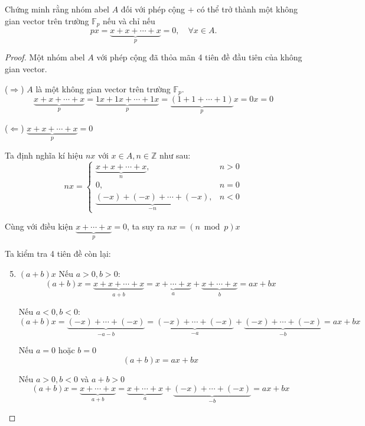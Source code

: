 \begin{exercise}
    Chứng minh rằng nhóm abel $A$ đối với phép cộng $+$ có thể trở thành một không gian vector trên trường $\mathbb{F}_{p}$ nếu và chỉ nếu
    \[ px = \underbrace{x + x + \cdots + x}_{p} = 0,\quad \forall x\in A. \]
\end{exercise}

\begin{proof}
    Một nhóm abel $A$ với phép cộng đã thỏa mãn 4 tiên đề đầu tiên của không gian vector.
    
    ($\Rightarrow$) $A$ là một không gian vector trên trường $\mathbb{F}_{p}$.
    \[ \underbrace{x + x + \cdots + x}_{p} = \underbrace{1x + 1x + \cdots + 1x}_{p} = \underbrace{(1 + 1 + \cdots + 1)}_{p}x = 0x = 0 \]
    
    ($\Leftarrow$) $\underbrace{x + x + \cdots + x}_{p} = 0$
    
    Ta định nghĩa kí hiệu $nx$ với $x\in A, n\in\mathbb{Z}$ như sau:
    \[
        nx =
        \begin{cases}
            \underbrace{x + x + \cdots + x}_{n},           & n > 0 \\
            0,                                             & n = 0 \\
            \underbrace{(-x) + (-x) + \cdots + (-x)}_{-n}, & n < 0
        \end{cases}
    \]
    
    Cùng với điều kiện $\underbrace{x + \cdots + x}_{p} = 0$, ta suy ra $nx = (n\bmod{p})x$
    
    Ta kiểm tra 4 tiên đề còn lại:
    \begin{enumerate}[label= (V\arabic*)]
        \setcounter{enumi}{4}
        \item $(a + b)x$
              Nếu $a > 0, b > 0$:
              \[ (a + b)x = \underbrace{x + x + \cdots + x}_{a+b} = \underbrace{x + \cdots + x}_{a} + \underbrace{x + \cdots + x}_{b} = ax + bx \]
              
              Nếu $a < 0, b < 0$:
              \[ (a + b)x = \underbrace{(-x) + \cdots + (-x)}_{-a-b} = \underbrace{(-x) + \cdots + (-x)}_{-a} + \underbrace{(-x) + \cdots + (-x)}_{-b} = ax + bx \]
              
              Nếu $a = 0$ hoặc $b = 0$
              \[ (a + b)x = ax + bx \]
              
              Nếu $a > 0, b < 0$ và $a + b > 0$
              \[ (a + b)x = \underbrace{x + \cdots + x}_{a+b} = \underbrace{x + \cdots + x}_{a} + \underbrace{(-x) + \cdots + (-x)}_{-b} = ax + bx \]
              

\end{enumerate}
\end{proof}
